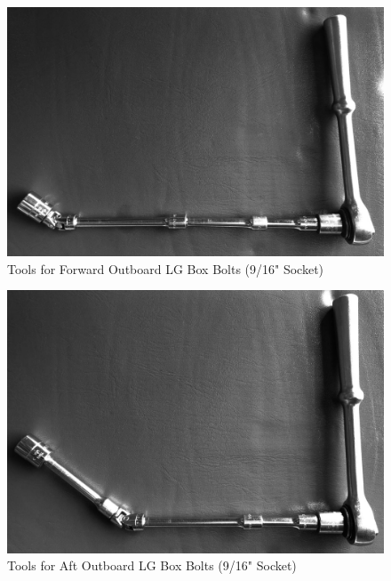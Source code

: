 \begin{figure}
[htb]
\begin{center}
\includegraphics[scale=0.2]{../Diagrams/LG_Box_Fwd}
\end{center}
\caption{Tools for Forward Outboard LG Box Bolts (9/16" Socket)}
\end{figure}

\begin{figure}
[htb]
\begin{center}
\includegraphics[scale=0.2]{../Diagrams/LG_Box_Aft}
\end{center}
\caption{Tools for Aft Outboard LG Box Bolts (9/16" Socket)}
\end{figure}

